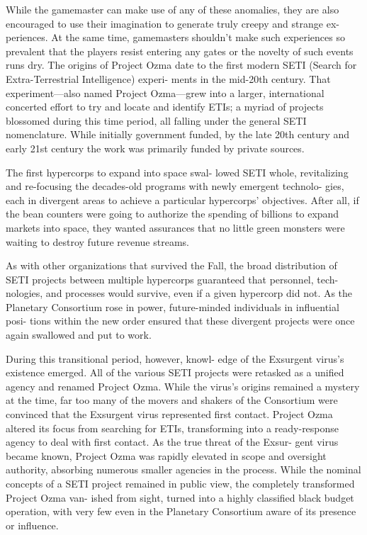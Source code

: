 While the gamemaster can make use of any of 
these anomalies, they are also encouraged to use their 
imagination to generate truly creepy and strange ex-
periences. At the same time, gamemasters shouldn't 
make such experiences so prevalent that the players 
resist entering any gates or the novelty of such events 
runs dry.
The origins of Project Ozma date to the first modern 
SETI (Search for Extra-Terrestrial Intelligence) experi-
ments in the mid-20th century. That experiment—also 
named Project Ozma—grew into a larger, international 
concerted effort to try and locate and identify ETIs; a 
myriad of projects blossomed during this time period, 
all falling under the general SETI nomenclature. While 
initially government funded, by the late 20th century 
and early 21st century the work was primarily funded 
by private sources. 

The first hypercorps to expand into space swal-
lowed SETI whole, revitalizing and re-focusing the 
decades-old programs with newly emergent technolo-
gies, each in divergent areas to achieve a particular 
hypercorps' objectives. After all, if the bean counters 
were going to authorize the spending of billions to 
expand markets into space, they wanted assurances 
that no little green monsters were waiting to destroy 
future revenue streams. 

As with other organizations that survived the Fall, 
the broad distribution of SETI projects between 
multiple hypercorps guaranteed that personnel, tech-
nologies, and processes would survive, even if a given 
hypercorp did not. As the Planetary Consortium rose 
in power, future-minded individuals in influential posi-
tions within the new order ensured that these divergent 
projects were once again swallowed and put to work. 

During this transitional period, however, knowl-
edge of the Exsurgent virus's existence emerged. All 
of the various SETI projects were retasked as a unified 
agency and renamed Project Ozma. While the virus's 
origins remained a mystery at the time, far too many 
of the movers and shakers of the Consortium were 
convinced that the Exsurgent virus represented first 
contact. Project Ozma altered its focus from searching 
for ETIs, transforming into a ready-response agency to 
deal with first contact. As the true threat of the Exsur-
gent virus became known, Project Ozma was rapidly 
elevated in scope and oversight authority, absorbing 
numerous smaller agencies in the process. While the 
nominal concepts of a SETI project remained in public 
view, the completely transformed Project Ozma van-
ished from sight, turned into a highly classified black 
budget operation, with very few even in the Planetary 
Consortium aware of its presence or influence. 

